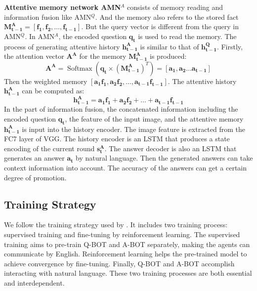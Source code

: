 \documentclass[review]{elsarticle}
\begin{document}
	\textbf{Attentive memory network AMN$^{A}$} consists of memory reading and information fusion like AMN$^{Q}$. And the memory also refers to the stored fact $\mathbf{M^{A}_{t-1}} = \left[\mathbf{f_{1}}, \mathbf{f_{2}}, \dots, \mathbf{f_{t-1}} \right]$. But the query vector is different from the query in AMN$^{Q}$. 
	In AMN$^{A}$, the encoded question $\mathbf{q_{t}}$ is used to read the memory. The process of generating attentive history $\mathbf{h^{A}_{t-1}}$ is similar to that of $\mathbf{h^{Q}_{t-1}}$. Firstly, the attention vector $\mathbf{A^{A}}$ for the memory $\mathbf{M^{A}_{t-1}}$ is produced:
	\begin{equation}
		\mathbf{A^{A}}=\operatorname{Softmax}\left(\mathbf{q_{t}} \times\left(\mathbf{M_{t-1}^{A}}\right)^{T}\right)=\left[\mathbf{a_{1}}, \mathbf{a_{2}} \dots \mathbf{a_{t-1}}\right]
		\label{Eq3}
		\end{equation}
	Then the weighted memory $\left[\mathbf{a_{1}f_{1}}, \mathbf{a_{2}f_{2}}, \dots, \mathbf{a_{t-1}f_{t-1}} \right]$. The attentive history $\mathbf{h^{A}_{t-1}}$ can be computed as:
	\begin{equation}
	\mathbf{h_{t-1}^{A}}=\mathbf{a_{1} f_{1}}+\mathbf{a_{2} f_{2}}+\ldots+\mathbf{a_{t-1} f_{t-1}}
	\label{Eq4}
	\end{equation}
	In the part of information fusion, the concatenated information including the encoded question $\mathbf{q_{t}}$, the feature of the input image, and the attentive memory $\mathbf{h^{A}_{t-1}}$ is input into the history encoder.
	The image feature is extracted from the FC7 layer of VGG. The history encoder is an LSTM that produces a state encoding of the current round $\mathbf{s^{A}_{t}}$. The answer decoder is also an LSTM that generates an answer $\mathbf{a_{t}}$ by natural language. 
	Then the generated answers can take context information into account. The accuracy of the answers can get a certain degree of promotion. 	
	
	
	\subsection{Training Strategy}
	We follow the training strategy used by \cite{DBLP:conf/iccv/DasKMLB17}. It includes two training process: supervised training and fine-tuning by reinforcement learning. The supervised training aims to pre-train Q-BOT and A-BOT separately, making the agents can communicate by English.
	Reinforcement learning helps the pre-trained model to achieve convergence by fine-tuning. Finally, Q-BOT and A-BOT accomplish interacting with natural language. These two training processes are both essential and interdependent.
	
\end{document}
